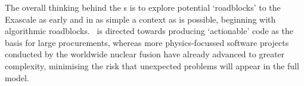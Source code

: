 
The overall thinking behind the \papp s is to explore potential `roadblocks' to the Exascale as
early and in as simple a context as is possible, beginning with algorithmic
roadblocks. \nep \ is directed towards producing `actionable' code as the basis
for large procurements, whereas
more physics-focussed software projects conducted by the
worldwide nuclear fusion have already advanced to greater complexity,
minimising the risk that unexpected problems will appear in the full model.

